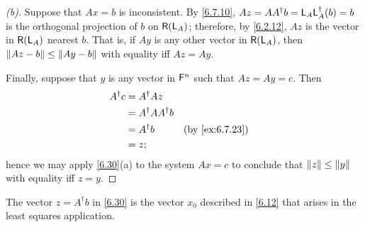 \begin{proof}[(b)]
  Suppose that \(Ax = b\) is inconsistent.
  By \cref{6.7.10}, \(Az = A A^{\dag} b = \mathsf{L}_A \mathsf{L}_A^{\dag}(b) = b\) is the orthogonal projection of \(b\) on \(\rg{\L_A}\);
  therefore, by \cref{6.2.12}, \(Az\) is the vector in \(\rg{\L_A}\) nearest \(b\).
  That is, if \(Ay\) is any other vector in \(\rg{\L_A}\), then \(\left\lVert Az - b\right\rVert \leq \left\lVert Ay - b\right\rVert\) with equality iff \(Az = Ay\).

  Finally, suppose that \(y\) is any vector in \(\mathsf{F}^n\) such that \(Az = Ay = c\).
  Then
  \begin{align*}
    A^{\dag} c & = A^{\dag} A z                              \\
               & = A^{\dag} A A^{\dag} b                     \\
               & = A^{\dag} b            &  & \by{ex:6.7.23} \\
               & = z;
  \end{align*}
  hence we may apply \cref{6.30}(a) to the system \(Ax = c\) to conclude that \(\left\lVert z\right\rVert \leq \left\lVert y\right\rVert\) with equality iff \(z = y\).
\end{proof}

\begin{note}
  The vector \(z = A^{\dag} b\) in \cref{6.30} is the vector \(x_0\) described in \cref{6.12} that arises in the least squares application.
\end{note}

\exercisesection


